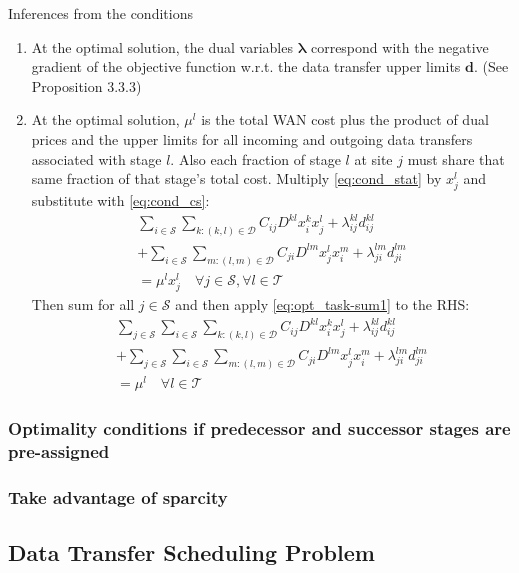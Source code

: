Inferences from the conditions
\begin{enumerate}
	\item At the optimal solution, the dual variables $\boldsymbol{\lambda}$ correspond with the negative gradient of the objective function w.r.t. the data transfer upper limits $\mathbf{d}$. (See \cite{bertsekas1999nonlinear} Proposition 3.3.3)
	\item At the optimal solution, $\mu^l$ is the total WAN cost plus the product of dual prices and the upper limits for all incoming and outgoing data transfers associated with stage $l$.
	Also each fraction of stage $l$ at site $j$ must share that same fraction of that stage's total cost. 
	Multiply \eqref{eq:cond_stat} by $x_j^l$ and substitute with \eqref{eq:cond_cs}:
	\begin{align}
		\sum_{i\in\mathcal{S}}\sum_{k:(k,l)\in\mathcal{D}} C_{ij}D^{kl}x_i^kx_j^l + \lambda_{ij}^{kl}d_{ij}^{kl} \nonumber \\
		+ \sum_{i\in\mathcal{S}}\sum_{m:(l,m)\in\mathcal{D}} C_{ji}D^{lm}x_j^lx_i^m+ \lambda_{ji}^{lm}d_{ji}^{lm} \nonumber \\
		= \mu^lx_j^l
		\quad \forall j\in\mathcal{S},\forall l\in\mathcal{T}
	\end{align}
	Then sum for all $j\in\mathcal{S}$ and then apply \eqref{eq:opt_task-sum1} to the RHS:
	\begin{align}
		\sum_{j\in\mathcal{S}}\sum_{i\in\mathcal{S}}\sum_{k:(k,l)\in\mathcal{D}} C_{ij}D^{kl}x_i^kx_j^l + \lambda_{ij}^{kl}d_{ij}^{kl} \nonumber \\
		+ \sum_{j\in\mathcal{S}}\sum_{i\in\mathcal{S}}\sum_{m:(l,m)\in\mathcal{D}} C_{ji}D^{lm}x_j^lx_i^m+ \lambda_{ji}^{lm}d_{ji}^{lm} \nonumber \\
		= \mu^l
		\quad \forall l\in\mathcal{T}
	\end{align}
\end{enumerate}

\subsubsection{Optimality conditions if predecessor and successor stages are pre-assigned} \todo{}

\subsubsection{Take advantage of sparcity} \todo{}

\subsection{Data Transfer Scheduling Problem}


